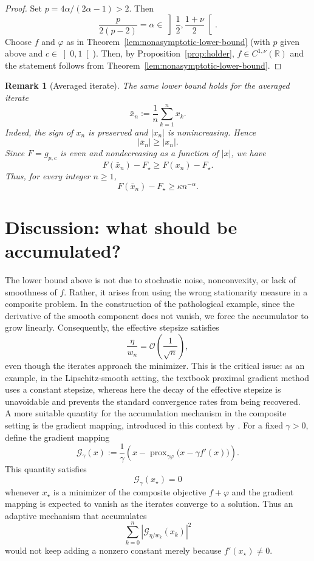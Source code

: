 \documentclass[11pt]{article}
\newtheorem{remark}{Remark}
\newcommand{\R}{\mathbb{R}}
\newcommand{\prox}{\operatorname{prox}}
\newcommand{\gradmap}{\mathcal{G}}
\begin{document}
\begin{proof}
Set $p = 4\alpha /(2\alpha-1)>2$. Then
\begin{equation*}
\frac{p}{2(p-2)} = \alpha \in \left]\frac1 2, \frac{1+\nu}{2}\right[.
\end{equation*}
Choose $f$ and $\varphi$ as in Theorem~\ref{lem:nonasymptotic-lower-bound} (with $p$ given above and $c\in \left]0,1\right[$).
Then, by Proposition~\ref{prop:holder}, \(f\in C^{1,\nu}(\R)\) and the statement follows from Theorem~\ref{lem:nonasymptotic-lower-bound}.
\end{proof}
\begin{remark}[Averaged iterate]
The same lower bound holds for the averaged iterate
\[
    \bar x_n:=\frac1n\sum_{k=1}^n x_k.
\]
Indeed, the sign of \(x_n\) is preserved and \(|x_n|\) is nonincreasing. Hence
\[
    |\bar x_n|\ge |x_n|.
\]
Since \(F=g_{p,c}\) is even and nondecreasing as a function of \(|x|\), we have
\[
    F(\bar x_n)-F_\star
    \ge
    F(x_n)-F_\star.
\]
Thus, for every integer $n\geq 1$,
\[
    F(\bar x_n)-F_\star
    \ge
    \kappa n^{-\alpha}.
\]
\end{remark}

\section{Discussion: what should be accumulated?}\label{section:4}

The lower bound above is not due to stochastic noise, nonconvexity, or lack of smoothness of \(f\). Rather, it arises from using the wrong stationarity measure in a composite problem. In the construction of the pathological example, since the derivative of the smooth component does not vanish, we force the accumulator to grow linearly. Consequently, the effective stepsize satisfies
\[
\frac{\eta}{w_n}
= \mathcal{O}\left( \frac{1}{\sqrt{n}} \right),
\]
even though the iterates approach the minimizer. This is the critical issue: as an example, in the Lipschitz-smooth setting, the textbook proximal gradient method uses a constant stepsize, whereas here the decay of the effective stepsize is unavoidable and prevents the standard convergence rates from being recovered.\\


\noindent
A more suitable quantity for the accumulation mechanism in the composite setting is the gradient mapping, introduced in this context by \citet{antonakopoulos2025adaptive,wang2026universal}. For a fixed \(\gamma>0\), define the gradient mapping
\[
    \gradmap_\gamma(x)
    :=
    \frac1\gamma
    \left(
        x-\prox_{\gamma\varphi}
        \bigl(x-\gamma f'(x)\bigr)
    \right).
\]
This quantity satisfies
\[
    \gradmap_\gamma(x_\star)=0
\]
whenever \(x_\star\) is a minimizer of the composite objective $f+\varphi$ and the gradient mapping is expected to vanish as the iterates converge to a solution. Thus an adaptive mechanism that accumulates
\[
    \sum_{k=0}^n |\gradmap_{\eta/w_k}(x_k)|^2
\]
would not keep adding a nonzero constant merely because \(f'(x_\star)\neq 0\). \\
\end{document}
